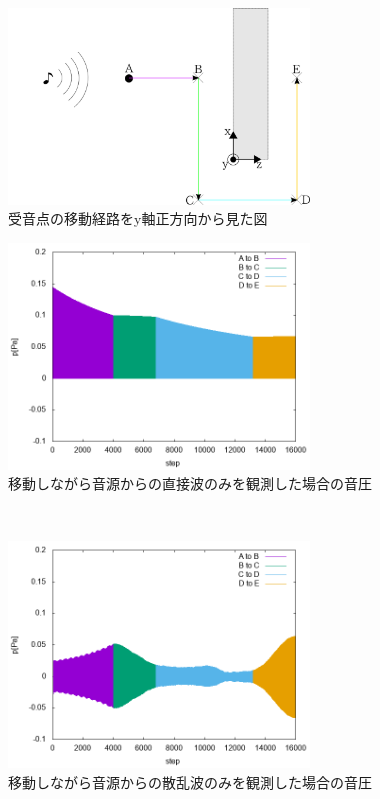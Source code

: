 \documentclass[dvipdfmx]{ampbt}
\begin{document}
\begin{figure}[H]
  \begin{center}
    \includegraphics[clip,width=8.0cm]{./png/route_ue.png}
    \caption{受音点の移動経路をy軸正方向から見た図}
    \label{fig:route_ue}
  \end{center}
\end{figure}

\begin{figure}[H]
  \begin{center}
    \includegraphics[clip,width=8.0cm]{./png/kyoukai_chokusetsu.png}
    \caption{移動しながら音源からの直接波のみを観測した場合の音圧}
    \label{fig:kyoukai_chokusetsu}
  \end{center}
\end{figure}\\

\begin{figure}[H]
  \begin{center}
    \includegraphics[clip,width=8.0cm]{./png/kyoukai_hansya.png}
    \caption{移動しながら音源からの散乱波のみを観測した場合の音圧}
    \label{fig:kyoukai_hansya}
  \end{center}
\end{figure}\\
\end{document}
